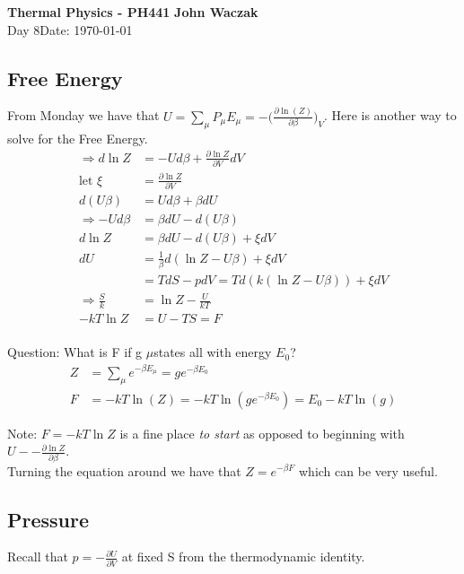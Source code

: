 \documentclass[a4paper, 11pt]{article}
\begin{document}
\noindent
\large\textbf{Thermal Physics - PH441} \hfill \textbf{John Waczak} \\
\normalsize Day 8\hfill  Date: \today \\

\subsection*{Free Energy}
	From Monday we have that $U = \sum\limits_\mu P_\mu E_\mu = - \Big(\frac{\partial \ln(Z)}{\partial\beta}\Big)_V$. Here is another way to solve for the Free Energy. 
		\begin{align*}
			\Rightarrow d\ln Z &= -U d\beta + \frac{\partial \ln Z}{\partial V}dV \\
			\text{let } \xi &= \frac{\partial \ln Z}{\partial V} \\ 
			d(U\beta) &= Ud\beta + \beta dU \\ 
			\Rightarrow -Ud\beta &= \beta dU - d(U\beta) \\ 
			d\ln Z &= \beta dU - d(U\beta) + \xi dV \\ 
			dU &= \frac{1}{\beta} d(\ln Z - U\beta) + \xi dV \\ 
				&= TdS - pdV = Td(k(\ln Z - U\beta)) + \xi dV \\ 
			\Rightarrow \frac{S}{k} &= \ln Z - \frac{U}{kT} \\ 
			-kT\ln Z &= U - TS = F \\ 
		\end{align*}
  
	  \noindent Question: What is F if g $\mu$states all with energy $E_0$? 
		  \begin{align*}
			  Z &= \sum\limits_\mu e^{-\beta E_\mu} = ge^{-\beta E_0} \\ 
			  F &= -kT\ln(Z) =-kT\ln(ge^{-\beta E_0}) = E_0 - kT\ln(g)
		  \end{align*}
	  
	  \noindent Note: $F=-kT\ln Z$ is a fine place \textit{to start} as opposed to beginning with $U - - \frac{\partial \ln Z}{\partial \beta}$. \\ 
	  
	  \noindent Turning the equation around we have that $Z = e^{-\beta F}$ which can be very useful. 

\subsection*{Pressure} 
	Recall that $p = -\frac{\partial U}{\partial V}$ at fixed S from the thermodynamic identity. \\ 
	
\end{document}
